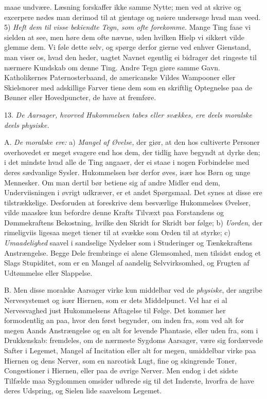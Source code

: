 \documentclass[12pt,a4paper]{article}
\newcommand{\opage}[1]{\marginnote{\footnotesize\textit{[#1]}}}
\begin{document}
maae undvære. Læsning forskaffer ikke samme Nytte; men ved at skrive og excerpere nødes
man derimod til at gientage og nøiere undersøge hvad man veed. 5) \emph{Heft dem til
visse bekiendte Tegn, som ofte forekomme.} Mange Ting faae vi sielden at see, men høre
dem ofte nævne, uden hvilken Hielp vi sikkert vilde glemme dem. Vi føle dette selv, og
spørge derfor gierne ved enhver Gienstand, man viser os, hvad den heder, uagtet Navnet
egentlig ei bidrager det ringeste til nærmere Kundskab om denne Ting. Andre Tegn giøre
samme Gavn. Katholikernes Paternosterbaand, de americanske Vildes Wampooner eller
Skielsnorer med adskillige Farver tiene dem som en skriftlig Optegnelse paa de Bønner
eller Hovedpuncter, de have at fremføre.

\opage{118} 13. \emph{De Aarsager, hvorved Hukommelsen tabes eller svækkes, ere deels moralske deels
physiske.}

A. \emph{De moralske ere:} a) \emph{Mangel af Øvelse,} der giør, at den hos cultiverte
Personer overhovedet er meget svagere end hos dem, der tidlig have begyndt at dyrke den;
i det mindste hvad alle de Ting angaaer, der ei staae i nogen Forbindelse med deres
sædvanlige Sysler. Hukommelsen bør derfor øves, især hos Børn og unge Mennesker. Om man
dertil bør betiene sig af andre Midler end dem, Underviisningen i øvrigt udkræver, er et
andet Spørgsmaal. Det synes at disse ere tilstrækkelige. Desforuden at foreskrive dem
besværlige Hukommelses Øvelser, vilde maaskee kun befordre denne Krafts Tilvæxt paa
Forstandens og Dømmekraftens Bekostning, hvilke den Skridt for Skridt bør følge;
b) \emph{Uorden}, der rimeligviis ligesaa meget tiener til at svække som Orden til at
styrke; c) \emph{Umaadelighed} saavel i sandselige Nydelser som i Studeringer og
Tænkekraftens Anstrængelse. Begge Dele frembringe ei alene Glemsomhed, men tilsidst endog
et Slags Stupiditet, som er en Mangel af aandelig Selvvirksomhed, og Frugten af
Udtømmelse eller Slappelse.

B. Men disse moralske Aarsager virke kun middelbar ved de \emph{physiske}, der angribe
Nervesystemet og især Hiernen, som er dets Middelpunct. Vel har ei
\opage{119} al Nervesvaghed just Hukommelsens Aftagelse til Følge. Det kommer her formodentlig an
paa, hvor den først begynder, om inden fra, som ved alt for megen Aands Anstrængelse og
en alt for levende Phantasie, eller uden fra, som i Drukkenskab: fremdeles, om de
nærmeste Sygdoms Aarsager, være sig fordærvede Safter i Legemet, Mangel af Incitation
eller alt for megen, umiddelbar virke paa Hiernen og dens Nerver, som en narcotisk Lugt,
fine og skingrende Toner, Congestioner i Hiernen, eller paa de øvrige Nerver. Men endog i
det sidste Tilfælde maa Sygdommen omsider udbrede sig til det Inderste, hvorfra de have
deres Udspring, og Sielen lide saavelsom Legemet.
\end{document}
